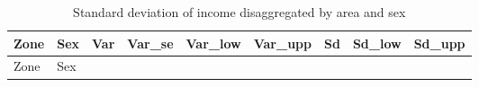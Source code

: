 \documentclass[
  english,
  12pt,
]{book}
\begin{document}
\begin{longtable}[]{@{}
  >{\raggedright\arraybackslash}p{}
  >{\centering\arraybackslash}p{}
  >{\centering\arraybackslash}p{}
  >{\centering\arraybackslash}p{}
  >{\centering\arraybackslash}p{}
  >{\centering\arraybackslash}p{}
  >{\centering\arraybackslash}p{}
  >{\centering\arraybackslash}p{}
  >{\centering\arraybackslash}p{}@{}}
\caption{\label{tab:tab-sd-ingreso-zona-sexo}Standard deviation of income disaggregated by area and sex}\tabularnewline
\toprule\noalign{}
\begin{minipage}[b]{\linewidth}\raggedright
Zone
\end{minipage} & \begin{minipage}[b]{\linewidth}\centering
Sex
\end{minipage} & \begin{minipage}[b]{\linewidth}\centering
Var
\end{minipage} & \begin{minipage}[b]{\linewidth}\centering
Var\_se
\end{minipage} & \begin{minipage}[b]{\linewidth}\centering
Var\_low
\end{minipage} & \begin{minipage}[b]{\linewidth}\centering
Var\_upp
\end{minipage} & \begin{minipage}[b]{\linewidth}\centering
Sd
\end{minipage} & \begin{minipage}[b]{\linewidth}\centering
Sd\_low
\end{minipage} & \begin{minipage}[b]{\linewidth}\centering
Sd\_upp
\end{minipage} \\
\midrule\noalign{}
\endfirsthead
\toprule\noalign{}
\begin{minipage}[b]{\linewidth}\raggedright
Zone
\end{minipage} & \begin{minipage}[b]{\linewidth}\centering
Sex
\end{minipage} & \begin{minipage}[b]{\linewidth}\centering

\end{minipage}
\end{longtable}
\end{document}
